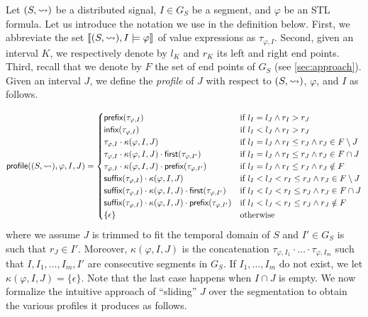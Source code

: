 Let $(S,{\rightsquigarrow})$ be a distributed signal, $I \in G_S$ be a segment, and $\varphi$ be an STL formula.
Let us introduce the notation we use in the definition below.
First, we abbreviate the set $\llbracket (S,{\rightsquigarrow}), I \models \varphi \rrbracket$ of value expressions as $\tau_{\varphi,I}$.
Second, given an interval $K$, we respectively denote by $l_K$ and $r_K$ its left and right end points.
Third, recall that we denote by $F$ the set of end points of $G_S$ (see \cref{sec:approach}).
Given an interval $J$, we define the \emph{profile} of $J$ with respect to $(S,{\rightsquigarrow})$, $\varphi$, and $I$ as follows.

\scriptsize
\begin{equation*}
	\mathsf{profile}((S,{\rightsquigarrow}), \varphi, I, J) =
	\begin{cases}
		\textsf{prefix}(\tau_{\varphi,I}) & \text{if } l_I = l_J \land r_I > r_J \\
		\textsf{infix}(\tau_{\varphi,I}) & \text{if } l_I < l_J \land r_I > r_J \\
		\tau_{\varphi,I} \cdot \kappa(\varphi, I, J) & \text{if } l_I = l_J \land r_I \leq r_J \land r_J \in F \setminus J \\
		\tau_{\varphi,I} \cdot \kappa(\varphi, I, J) \cdot \textsf{first}(\tau_{\varphi,I'}) & \text{if } l_I = l_J \land r_I \leq r_J \land r_J \in F \cap J  \\		
		\tau_{\varphi,I} \cdot \kappa(\varphi, I, J) \cdot \textsf{prefix}(\tau_{\varphi,I'}) & \text{if } l_I = l_J \land r_I \leq r_J \land r_J \notin F  \\
		\textsf{suffix}(\tau_{\varphi,I}) \cdot \kappa(\varphi, I, J) & \text{if }  l_I < l_J < r_I \leq r_J \land r_J \in F \setminus J  \\
		\textsf{suffix}(\tau_{\varphi,I}) \cdot \kappa(\varphi, I, J) \cdot \textsf{first}(\tau_{\varphi,I'}) & \text{if } l_I < l_J < r_I \leq r_J \land r_J \in F \cap J \\
		\textsf{suffix}(\tau_{\varphi,I}) \cdot \kappa(\varphi, I, J) \cdot \textsf{prefix}(\tau_{\varphi,I'}) & \text{if } l_I < l_J < r_I \leq r_J \land r_J \notin F \\
		\{\epsilon\} & \text{otherwise}
	\end{cases}
\end{equation*}
\normalsize
where we assume $J$ is trimmed to fit the temporal domain of $S$ and $I' \in G_S$ is such that $r_J \in I'$.
Moreover, $\kappa(\varphi, I, J)$ is the concatenation $\tau_{\varphi,I_1} \cdot \ldots \cdot \tau_{\varphi,I_m}$ such that $I, I_1, \ldots, I_m, I'$ are consecutive segments in $G_S$.
If $I_1, \ldots, I_m$ do not exist, we let $\kappa(\varphi, I, J) = \{\epsilon\}$.
Note that the last case happens when $I \cap J$ is empty.
We now formalize the intuitive approach of ``sliding'' $J$ over the segmentation to obtain the various profiles it produces as follows.

